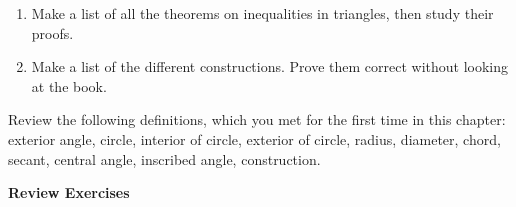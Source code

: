 \documentclass[11pt]{book}
\theoremstyle{bkplain}
\theoremstyle{XIplainnote}
\theoremstyle{bkplain}
\theoremstyle{bkplain}
\begin{document}
\begin{enumerate}[label=(\alph*), leftmargin=2.2em, itemsep=3pt]
\item Make a list of all the theorems on inequalities in triangles, then study
  their proofs.
\item Make a list of the different \RC{} constructions. Prove them correct
  without looking at the book.
\end{enumerate}

Review the following definitions, which you met for the first time in this
chapter: exterior angle, circle, interior of circle, exterior of circle,
radius, diameter, chord, secant, central angle, inscribed angle, \RC{}
construction.

\begin{center}\bfseries Review Exercises\end{center}\nopagebreak
\end{document}
